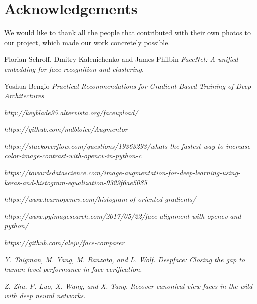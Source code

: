 \documentclass[10pt,twocolumn,letterpaper]{article}
\begin{document}










\section*{Acknowledgements}
We would like to thank all the people that contributed with their own photos to our project, which made our work concretely possible.

\begin{thebibliography}{9}

Florian Schroff, Dmitry Kalenichenko and James Philbin
\textit{FaceNet: A unified embedding for face recognition and clustering}.

Yoshua Bengio
\textit{Practical Recommendations for Gradient-Based Training of Deep
Architectures}

\textit{http://keyblade95.altervista.org/faceupload/}

\textit{https://github.com/mdbloice/Augmentor}

\textit{https://stackoverflow.com/questions/19363293/whats-the-fastest-way-to-increase-color-image-contrast-with-opencv-in-python-c}

\textit{https://towardsdatascience.com/image-augmentation-for-deep-learning-using-keras-and-histogram-equalization-9329f6ae5085}

\textit{https://www.learnopencv.com/histogram-of-oriented-gradients/}

\textit{https://www.pyimagesearch.com/2017/05/22/face-alignment-with-opencv-and-python/}

\textit{https://github.com/aleju/face-comparer}

\textit{Y. Taigman, M. Yang, M. Ranzato, and L. Wolf. Deepface:
Closing the gap to human-level performance in face verification.}

\textit{Z. Zhu, P. Luo, X. Wang, and X. Tang. Recover canonical view
faces in the wild with deep neural networks.}

\end{thebibliography}
\end{document}
